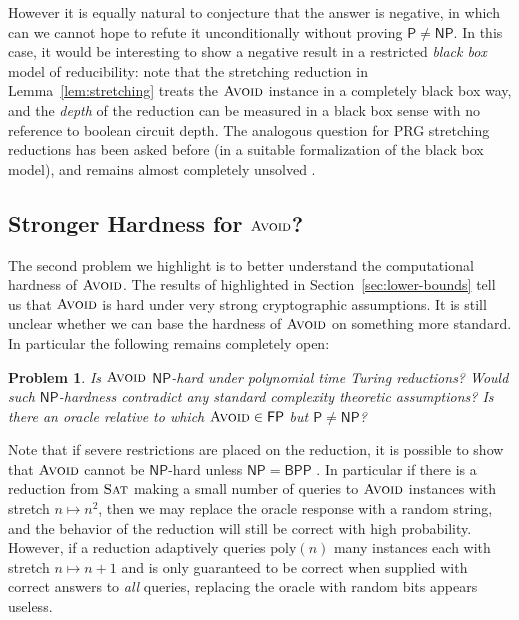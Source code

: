 \documentclass[11pt]{article}
\newtheorem{problem}{Problem}
\newcommand{\poly}{\mathrm{poly}}
\newcommand{\avoid}{\textsc{Avoid}}
\begin{document}
However it is equally natural to conjecture that the answer is negative, in which can we cannot hope to refute it unconditionally without proving $\mathsf{P} \neq \mathsf{NP}$. In this case, it would be interesting to show a negative result in a restricted \emph{black box} model of reducibility: note that the stretching reduction in Lemma~\ref{lem:stretching} treats the $\avoid$ instance in a completely black box way, and the \emph{depth} of the reduction can be measured in a black box sense with no reference to boolean circuit depth. The analogous question for PRG stretching reductions has been asked before (in a suitable formalization of the black box model), and remains almost completely unsolved \cite{stretching}.

\subsection{Stronger Hardness for $\avoid$?}
The second problem we highlight is to better understand the computational hardness of $\avoid$. The results of \cite{avoid-io,hardness-lwe} highlighted in Section~\ref{sec:lower-bounds} tell us that $\avoid$ is hard under very strong cryptographic assumptions. It is still unclear whether we can base the hardness of $\avoid$ on something more standard. In particular the following remains completely open:
\begin{problem}
Is $\avoid$ $\mathsf{NP}$-hard under polynomial time Turing reductions? Would such $\mathsf{NP}$-hardness contradict any standard complexity theoretic assumptions? Is there an oracle relative to which $\avoid \in \mathsf{FP}$ but $\mathsf{P} \neq \mathsf{NP}$?	
\end{problem}

Note that if severe restrictions are placed on the reduction, it is possible to show that $\avoid$ cannot be $\mathsf{NP}$-hard unless $\mathsf{NP} = \mathsf{BPP}$ \cite{avoid-io}. In particular if there is a reduction from $\textsc{Sat}$ making a small number of queries to $\avoid$ instances with stretch $n \mapsto n^2$, then we may replace the oracle response with a random string, and the behavior of the reduction will still be correct with high probability. However, if a reduction adaptively queries $\poly(n)$ many instances each with stretch $n \mapsto n + 1$ and is only guaranteed to be correct when supplied with correct answers to \emph{all} queries, replacing the oracle with random bits appears useless.
\end{document}
